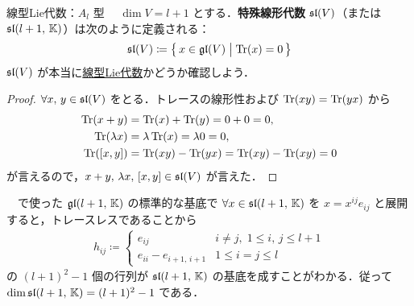 \documentclass[rep_main]{subfiles}
\begin{document}
\begin{myexample}[label=def:typeA]{線型Lie代数：$A_l$ 型}
    　$\dim V = l+1$ とする．\textbf{特殊線形代数} $\mathfrak{sl} (V)$（または $\mathfrak{sl} (l+1,\, \mathbb{K})$）は次のように定義される：
    \begin{align}
        \mathfrak{sl} (V) \coloneqq \bigl\{\, x \in \mathfrak{gl} (V) \bigm| \Tr (x) = 0 \,\bigr\} 
    \end{align}
    $\mathfrak{sl} (V)$ が本当に\hyperref[def:linearLieAlg]{線型Lie代数}かどうか確認しよう．
    \begin{proof}
        $\forall x,\, y \in \mathfrak{sl} (V)$ をとる．トレースの線形性および $\Tr (xy) = \Tr (yx)$ から
        \begin{align}
            \Tr (x + y) &= \Tr (x) + \Tr (y) = 0 + 0 = 0, \\
            \Tr (\lambda x) &= \lambda \Tr (x) = \lambda 0 = 0, \\
            \Tr (\comm{x}{y}) &= \Tr (xy) - \Tr (yx) = \Tr (xy) - \Tr (xy) = 0
        \end{align}
        が言えるので，$x + y,\, \lambda x,\, \comm{x}{y} \in \Lsl (V)$ が言えた．
    \end{proof}
    　で使った $\mathfrak{gl}(l+1,\, \mathbb{K})$ の標準的な基底で $\forall x \in \mathfrak{sl}(l+1,\, \mathbb{K})$ を $x = x^{ij} e_{ij}$ と展開すると，トレースレスであることから
    \begin{align}
        h_{ij} \coloneqq 
        \begin{cases}
            e_{ij} &i \neq j,\; 1 \le i,\, j \le l+1 \\
            e_{ii} - e_{i+1,\, i+1} &1 \le i=j \le l
        \end{cases}
    \end{align}
    の $(l+1)^2 - 1$ 個の行列が $\mathfrak{sl}(l+1,\, \mathbb{K})$ の基底を成すことがわかる．従って $\dim \mathfrak{sl}(l+1,\, \mathbb{K}) = (l+1)^2 -1$ である．
\end{myexample}
\end{document}
